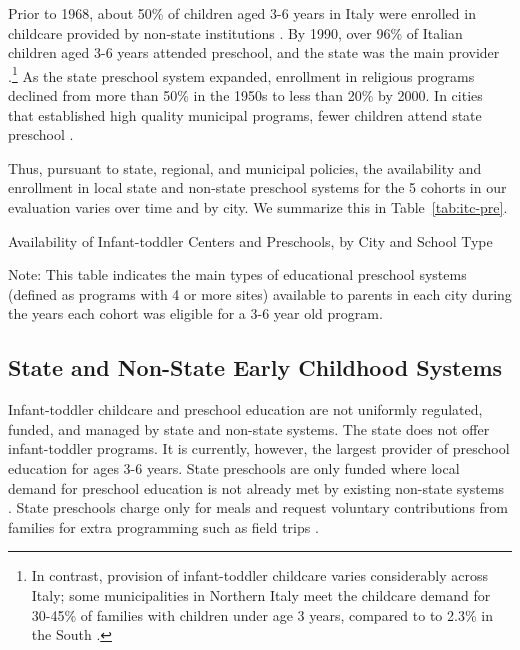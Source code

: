 Prior to 1968, about 50\% of children aged 3-6 years in Italy were enrolled in childcare provided by non-state institutions \citep{Hohnerlein Paradox 2009}. By 1990, over 96\% of Italian children aged 3-6 years attended preschool, and the state was the main provider \citep{Hohnerlein_2015_Development-and-DiffusionEnrollment}.\footnote{In contrast, provision of infant-toddler childcare varies considerably across Italy; some municipalities in Northern Italy meet the childcare demand for 30-45\% of families with children under age 3 years, compared to to 2.3\% in the South \citep{Becchi-Ferrari_1990_Pub-Inf-Centres-Italy,Musatti-Picchio_2010_IJEC}.} As the state preschool system expanded, enrollment in religious programs declined from more than 50\% in the 1950s to less than 20\% by 2000. In cities that established high quality municipal programs, fewer children attend state preschool \citep{OECD_2001_Italy-Country-Note}. 

Thus, pursuant to state, regional, and municipal policies, the availability and enrollment in local state and non-state preschool systems for the 5 cohorts in our evaluation varies over time and by city. We summarize this in Table~\ref{tab:itc-pre}. 

\begin{table}[H]
\centering
\caption{Availability of Infant-toddler Centers and Preschools, by City and School Type}\label{tab:itc-pre}
\begin{adjustbox}{width=\textwidth}
\begin{threeparttable}
	
\begin{tablenotes}
Note: This table indicates the main types of educational preschool systems (defined as programs with 4 or more sites) available to parents in each city during the years each cohort was eligible for a 3-6 year old program. 
\end{tablenotes}
\end{threeparttable}
\end{adjustbox}
\end{table}

\subsection{State and Non-State Early Childhood Systems}

Infant-toddler childcare and preschool education are not uniformly regulated, funded, and managed by state and non-state systems. The state does not offer infant-toddler programs. It is currently, however, the largest provider of preschool education for ages 3-6 years. State preschools are only funded where local demand for preschool education is not already met by existing non-state systems \citep{Hohnerlein Paradox 2009}. State preschools charge only for meals and request voluntary contributions from families for extra programming such as field trips \citep{CEHD_2016_Historical-Analysis}. 

